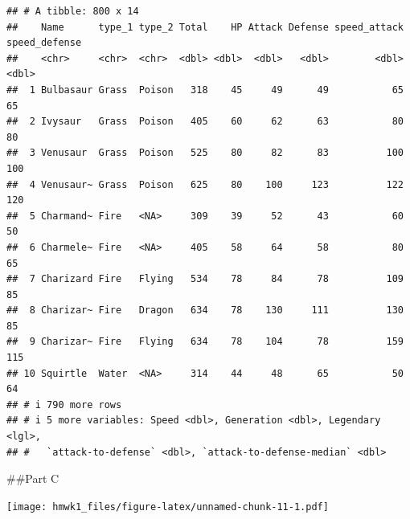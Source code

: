 \documentclass[
]{article}
\newenvironment{Shaded}{\begin{snugshade}}{\end{snugshade}}
\newcommand{\AttributeTok}[1]{\textcolor[rgb]{0.13,0.29,0.53}{#1}}
\newcommand{\FunctionTok}[1]{\textcolor[rgb]{0.13,0.29,0.53}{\textbf{#1}}}
\newcommand{\NormalTok}[1]{#1}
\newcommand{\OtherTok}[1]{\textcolor[rgb]{0.56,0.35,0.01}{#1}}
\newcommand{\SpecialCharTok}[1]{\textcolor[rgb]{0.81,0.36,0.00}{\textbf{#1}}}
\newcommand{\StringTok}[1]{\textcolor[rgb]{0.31,0.60,0.02}{#1}}
\begin{document}
\begin{verbatim}
## # A tibble: 800 x 14
##    Name      type_1 type_2 Total    HP Attack Defense speed_attack speed_defense
##    <chr>     <chr>  <chr>  <dbl> <dbl>  <dbl>   <dbl>        <dbl>         <dbl>
##  1 Bulbasaur Grass  Poison   318    45     49      49           65            65
##  2 Ivysaur   Grass  Poison   405    60     62      63           80            80
##  3 Venusaur  Grass  Poison   525    80     82      83          100           100
##  4 Venusaur~ Grass  Poison   625    80    100     123          122           120
##  5 Charmand~ Fire   <NA>     309    39     52      43           60            50
##  6 Charmele~ Fire   <NA>     405    58     64      58           80            65
##  7 Charizard Fire   Flying   534    78     84      78          109            85
##  8 Charizar~ Fire   Dragon   634    78    130     111          130            85
##  9 Charizar~ Fire   Flying   634    78    104      78          159           115
## 10 Squirtle  Water  <NA>     314    44     48      65           50            64
## # i 790 more rows
## # i 5 more variables: Speed <dbl>, Generation <dbl>, Legendary <lgl>,
## #   `attack-to-defense` <dbl>, `attack-to-defense-median` <dbl>
\end{verbatim}

\#\#Part C

\begin{Shaded}
\end{Shaded}

\texttt{[image: hmwk1\_files/figure-latex/unnamed-chunk-11-1.pdf]}
\end{document}
